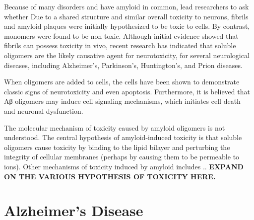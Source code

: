 

Because of many disorders and have amyloid in common, lead researchers to ask whether Due to a shared structure and similar overall toxicity to neurons, fibrils and amyloid plaques were initially hypothesized to be toxic to cells.  By contrast, monomers were found to be non-toxic. Although initial evidence showed that fibrils can possess toxicity in vivo, recent research has indicated that soluble oligomers are the likely causative agent for neurotoxicity, for several neurological diseases, including Alzheimer's, Parkinson's, Huntington's, and Prion diseases.\cite{Haass:2007db,Xue:2009da} %

When oligomers are added to cells, the cells have been shown to demonstrate classic signs of neurotoxicity and even apoptosis.\cite{Cappai:2007bc,Lambert:1998ve,Walsh:2002p2566,Shankar:2008bg} Furthermore, it is believed that Aβ oligomers may induce cell signaling mechanisms, which initiates cell death and neuronal dysfunction.\cite{Cappai:2007bc}

The molecular mechanism of toxicity caused by amyloid oligomers is not understood. %
The central hypothesis of amyloid-induced toxicity is that soluble oligomers cause toxicity by binding to the lipid bilayer and perturbing the integrity of cellular membranes (perhaps by causing them to be permeable to ions).\cite{Martins:2008bz,Walsh:2007fu} Other mechanisms of toxicity induced by amyloid includes .. %
\textbf{EXPAND ON THE VARIOUS HYPOTHESIS OF TOXICITY HERE.}

\section{Alzheimer's Disease}

